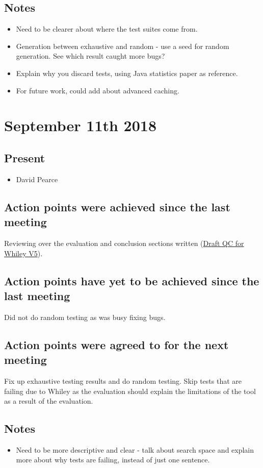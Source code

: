 \documentclass[]{article}
\begin{document}
\subsection{Notes}
\begin{itemize}
	\item Need to be clearer about where the test suites come from.
	\item Generation between exhaustive and random - use a seed for random generation. See which result caught more bugs? 
	\item Explain why you discard tests, using Java statistics paper as reference.
	\item For future work, could add about advanced caching.
\end{itemize}

\section{September 11th 2018}
\subsection{Present}
\begin{itemize}
	\item David Pearce
\end{itemize}

\subsection{Action points were achieved since the last meeting}
Reviewing over the evaluation and conclusion sections written (\href{https://gitlab.ecs.vuw.ac.nz/project489-2018/chinjani/quickcheck-for-whiley-final-report/blob/master/Draft%20V5%20QuickCheck%20for%20Whiley%20-%20Janice%20Chin.pdf}{Draft QC for Whiley V5}).  
\subsection{Action points have yet to be achieved since the last meeting}
Did not do random testing as was busy fixing bugs.
\subsection{Action points were agreed to for the next meeting}
Fix up exhaustive testing results and do random testing. Skip tests that are failing due to Whiley as the evaluation should explain the limitations of the tool as a result of the evaluation.
\subsection{Notes}
\begin{itemize}
	\item Need to be more descriptive and clear - talk about search space and explain more about why tests are failing, instead of just one sentence.
\end{itemize}
\end{document}
